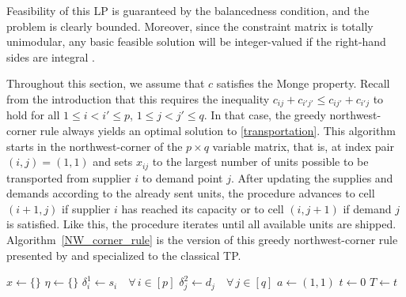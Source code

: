 \documentclass[letterpaper]{article}
\begin{document}
Feasibility of this LP is guaranteed by the balancedness condition, and the problem is clearly bounded. Moreover, since the constraint matrix is totally unimodular, any basic feasible solution will be integer-valued if the right-hand sides are integral \citep[see, e.g.,][]{bazaraa2010linear}.

Throughout this section, we assume that $c$ satisfies the Monge property. Recall from the introduction that this requires the inequality $c_{ij} + c_{i'j'} \leq c_{ij'} + c_{i'j}$ to hold for all $1 \leq i < i' \leq p$, $1 \leq j < j' \leq q$. In that case, the greedy northwest-corner rule always yields an optimal solution to \eqref{transportation}. This algorithm starts in the northwest-corner of the $p \times q$ variable matrix, that is, at index pair $(i, j) = (1, 1)$ and sets $x_{ij}$ to the largest number of units possible to be transported from supplier $i$ to demand point $j$. After updating the supplies and demands according to the already sent units, the procedure advances to cell $(i+1, j)$ if supplier $i$ has reached its capacity or to cell $(i, j+1)$ if demand $j$ is satisfied. Like this, the procedure iterates until all available units are shipped. Algorithm~\ref{NW_corner_rule} is the version of this greedy northwest-corner rule presented by \citet{queyranne_general_1998} and specialized to the classical TP.


\begin{algorithm}[ht]
\caption{Northwest-corner rule}\label{NW_corner_rule}
\DontPrintSemicolon
$x \gets \{\}$\;
$\eta \gets \{\}$\;
$\delta_i^1 \gets s_i \quad \forall \, i \in [p]$ 
$\delta_j^2 \gets d_j \quad \forall \, j \in [q]$ 
$a \gets (1,1)$ 
$t \gets 0$\;
$T \gets t$\;
\end{algorithm}
\end{document}
